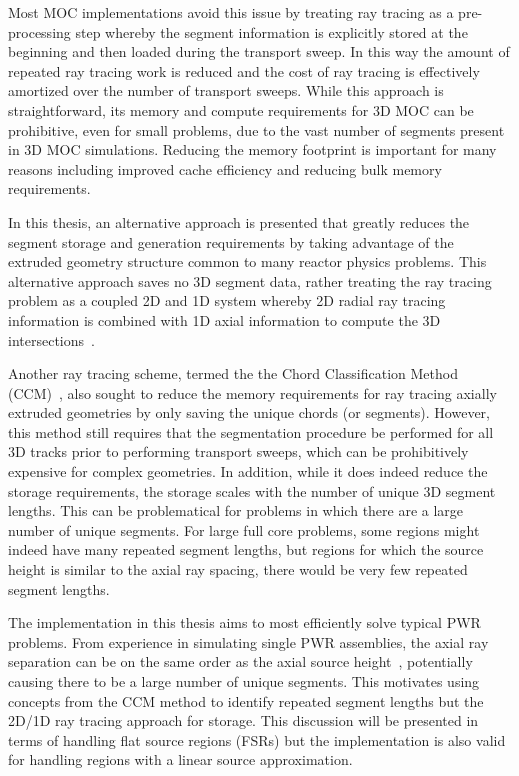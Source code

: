 Most MOC implementations avoid this issue by treating ray tracing as a pre-processing step whereby the segment information is explicitly stored at the beginning and then loaded during the transport sweep. In this way  the amount of repeated ray tracing work is reduced and the cost of ray tracing is effectively amortized over the number of transport sweeps. While this approach is straightforward, its memory and compute requirements for 3D MOC can be prohibitive, even for small problems, due to the vast number of segments present in 3D MOC simulations. Reducing the memory footprint is important for many reasons including improved cache efficiency and reducing bulk memory requirements.

In this thesis, an alternative approach is presented that greatly reduces the segment storage and generation requirements by taking advantage of the extruded geometry structure common to many reactor physics problems. This alternative approach saves no 3D segment data, rather treating the ray tracing problem as a coupled 2D and 1D system whereby 2D radial ray tracing information is combined with 1D axial information to compute the 3D intersections~\cite{physor2016}.

Another ray tracing scheme, termed the the Chord Classification Method (CCM)~\cite{Sciannandrone2015}, also sought to reduce the memory requirements for ray tracing axially extruded geometries by only saving the unique chords (or segments).  However, this method still requires that the segmentation procedure be performed for all 3D tracks prior to performing transport sweeps, which can be prohibitively expensive for complex geometries. In addition, while it does indeed reduce the storage requirements, the storage scales with the number of unique 3D segment lengths. This can be problematical for problems in which there are a large number of unique segments. For large full core problems, some regions might indeed have many repeated segment lengths, but regions for which the source height is similar to the axial ray spacing, there would be very few repeated segment lengths.

The implementation in this thesis aims to most efficiently solve typical PWR problems. From experience in simulating single PWR assemblies, the axial ray separation can be on the same order as the axial source height~\cite{mc2017}, potentially causing there to be a large number of unique segments. This motivates using concepts from the CCM method to identify repeated segment lengths but the 2D/1D ray tracing approach for storage.  This discussion will be presented in terms of handling flat source regions (FSRs) but the implementation is also valid for handling regions with a linear source approximation. 

